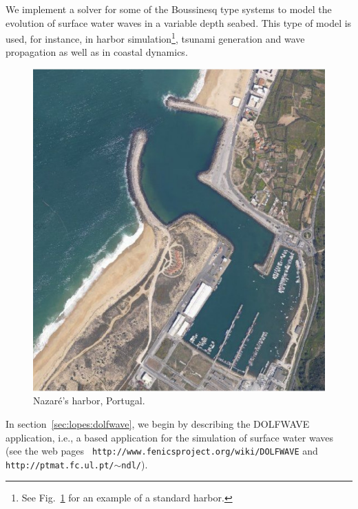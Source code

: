 We implement a solver for some of the Boussinesq type
systems to model the evolution of surface water
waves in a variable depth seabed.  This
type of model is used, for instance, in harbor
simulation\footnote{See Fig.~\ref{fig:lopes:harbor} for an
example of a standard harbor.}, tsunami generation and wave
propagation as well as in coastal dynamics.
\begin{figure}
\begin{center}
\includegraphics[width=\smallfig]{chapters/lopes/pdf/nazare1.pdf}
\end{center}
\caption{Nazar\'{e}'s harbor,
  Portugal.}\label{fig:lopes:harbor}
\end{figure}


In section~\ref{sec:lopes:dolfwave}, we begin by describing
the DOLFWAVE application, i.e., a \fenics based
application for the simulation of surface water waves (see
the web pages {\tt
http://www.fenicsproject.org/wiki/DOLFWAVE} and {\tt
http://ptmat.fc.ul.pt/$\sim$ndl/}).

